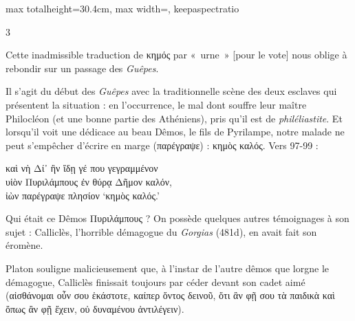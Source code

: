 \documentclass[11pt,twoside]{book}
\newcommand{\italique}[1]{\textit{#1}}
\newcommand{\citComm}[1]{\begin{quoting}[vskip=0.4pt,leftmargin=0.7em,rightmargin=0.2em]#1\end{quoting}}
\begin{document}
\begin{adjustbox}{max totalheight=30.4cm, max width=\textwidth, keepaspectratio}
\begin{minipage}{\textwidth}
{\begin{multicols}{3}
\par\vspace{1.5pt}
\noindent Cette inadmissible traduction de κημός par «~urne~» [pour le vote] nous oblige à rebondir sur un passage des \italique{Guêpes}.
\par\vspace{1.5pt}
\noindent Il s'agit du début des \italique{Guêpes} avec la traditionnelle scène des deux esclaves qui présentent la situation : en l'occurrence, le mal dont souffre leur maître Philocléon (et une bonne partie des Athéniens), pris qu'il est de \italique{philéliastite}. Et lorsqu'il voit une dédicace au beau Dêmos, le fils de Pyrilampe, notre malade ne peut s'empêcher d'écrire en marge (παρέγραψε) : κημὸς καλός. Vers 97-99 :
\citComm{καὶ νὴ Δί᾽ ἢν ἴδῃ γέ που γεγραμμένον\\
υἱὸν Πυριλάμπους ἐν θύρᾳ Δῆμον καλόν,\\
ἰὼν παρέγραψε πλησίον `κημὸς καλός.'}
\par\vspace{1.5pt}
\noindent Qui était ce Dêmos Πυριλάμπους ? On possède quelques autres témoignages à son sujet : Calliclès, l'horrible démagogue du \italique{Gorgias} (481d), en avait fait son éromène.
\par\vspace{1.5pt}
\noindent Platon souligne malicieusement que, à l'instar de l'autre dêmos que lorgne le démagogue, Calliclès finissait toujours par céder devant son cadet aimé (αἰσθάνομαι οὖν σου ἑκάστοτε, καίπερ ὄντος δεινοῦ, ὅτι ἂν φῇ σου τὰ παιδικὰ καὶ ὅπως ἂν φῇ ἔχειν, οὐ δυναμένου ἀντιλέγειν).
\par\end{multicols}}
\end{minipage}\end{adjustbox}
\newpage
\end{document}
